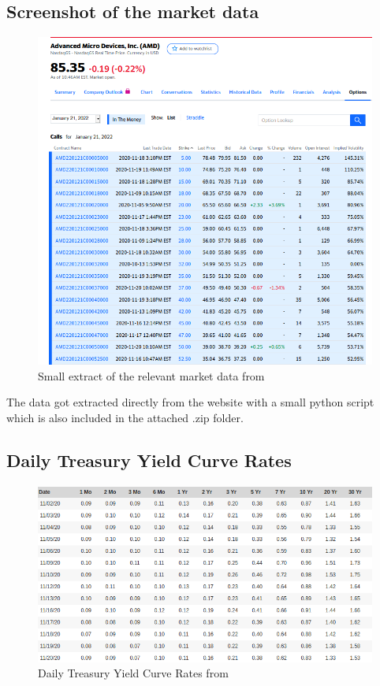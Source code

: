\documentclass[11pt,oneside,a4paper]{article}
\begin{document}
	\subsection{Screenshot of the market data}
	\begin{figure}[H]
		\centering
		\includegraphics[width=\linewidth]{screenshot.png}
		\caption{\label{treasure}Small extract of the relevant market data from \cite{site_yahoofinance}} 
	\end{figure}
	The data got extracted directly from the website with a small python script which is also included in the attached .zip folder.
	\subsection{Daily Treasury Yield Curve Rates}
	\begin{figure}[H]
		\centering
		\includegraphics[width=0.8\linewidth]{treasure.png}
		\caption{\label{treasure}Daily Treasury Yield Curve Rates from \cite{site_treasure}} 
	\end{figure}
	\newpage
	
	
	
	 
\end{document}
